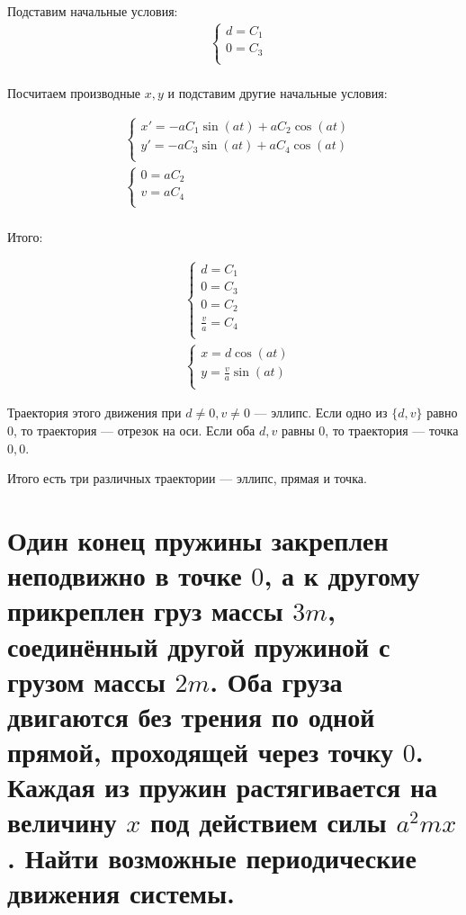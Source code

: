 Подставим начальные условия:
\begin{align*}
     & \begin{cases}
        d = C_1 \\
        0 = C_3 \\
    \end{cases} \\
\end{align*}

Посчитаем производные \(x, y\) и подставим другие начальные условия:

\begin{align*}
     & \begin{cases}
        x' = -a C_1\sin(at) + a C_2\cos(at) \\
        y' = -a C_3\sin(at) + a C_4\cos(at) \\
    \end{cases} \\
     & \begin{cases}
        0 = aC_2 \\
        v = aC_4 \\
    \end{cases} \\
\end{align*}

Итого:

\begin{align*}
     & \begin{cases}
        d = C_1           \\
        0 = C_3           \\
        0 = C_2           \\
        \frac{v}{a} = C_4 \\
    \end{cases} \\
     & \begin{cases}
        x = d\cos(at)            \\
        y = \frac{v}{a} \sin(at) \\
    \end{cases}
\end{align*}

Траектория этого движения при \(d\neq 0, v\neq 0\) --- эллипс. Если одно из \(\{d, v\}\) равно \(0\), то траектория --- отрезок на оси. Если оба \(d, v\) равны \(0\), то траектория --- точка \(0, 0\).

Итого есть три различных траектории --- эллипс, прямая и точка.

\section{Один конец пружины закреплен неподвижно в точке \(0\), а к другому прикреплен груз массы \(3m\), соединённый другой пружиной с грузом массы \(2m\). Оба груза двигаются без трения по одной прямой, проходящей через точку \(0\). Каждая из пружин растягивается на величину \(x\) под действием силы \(a^2mx\). Найти возможные периодические движения системы.}


